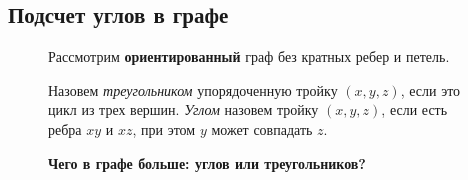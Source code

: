 \newpage %
\subsection{Подсчет углов в графе}

\begin{figure}[h!]
    \begin{minipage}{0.7\textwidth}
        Рассмотрим \textbf{ориентированный} граф без кратных ребер и петель.
        
        Назовем \textit{треугольником} упорядоченную тройку $ (x, y, z)$, если это цикл из трех вершин. \textit{Углом} назовем тройку  $ (x, y, z)$, если есть ребра  $ xy$ и $xz$, при этом  $ y $ может совпадать  $ z$.
        
        \textbf{Чего в графе больше: углов или треугольников?}
    \end{minipage}
	\begin{minipage}{0.25\textwidth}
	\end{minipage}
\end{figure}

